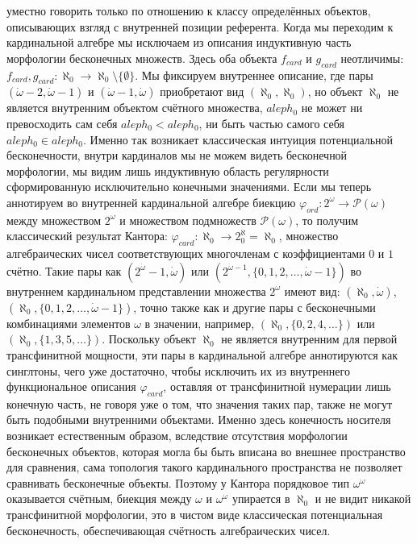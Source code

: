 \documentclass[12pt]{article}
\begin{document}
уместно говорить только по отношению к классу определённых объектов, описывающих взгляд с внутренней позиции референта. Когда мы переходим к кардинальной алгебре мы исключаем из описания индуктивную часть морфологии бесконечных множеств. Здесь оба объекта $f_{card}$ и $g_{card}$ неотличимы:  $f_{card}, g_{card} : \aleph_0 \to \aleph_0 \setminus \{ \emptyset \}$. Мы фиксируем внутреннее описание, где пары $(\dot{\omega} - 2, \dot{\omega} - 1)$ и $(\dot{\omega} - 1, \dot{\omega})$ приобретают вид $(\aleph_0, \aleph_0)$, но объект $\aleph_0$ не является внутренним объектом счётного множества, $aleph_0$ не может ни превосходить сам себя $aleph_0 < aleph_0$, ни быть частью самого себя $aleph_0 \in aleph_0$. Именно так возникает классическая интуиция потенциальной бесконечности, внутри кардиналов мы не можем видеть бесконечной морфологии, мы видим лишь индуктивную область регулярности сформированную исключительно конечными значениями. Если мы теперь аннотируем во внутренней кардинальной алгебре биекцию $\varphi_{ord} : 2^{\omega} \to \mathcal{P}(\omega)$ между множеством $2^{\omega}$ и множеством подмножеств $\mathcal{P}(\omega)$, то получим классический результат Кантора: $\varphi_{card} : \aleph_0 \to 2^\aleph_0 = \aleph_0$, множество алгебраических чисел соответствующих многочленам с коэффициентами $0$ и $1$ счётно. Такие пары как $(2^{\dot{\omega}} - 1, \dot{\omega})$ или $(2^{\dot{\omega} - 1}, \{ 0, 1, 2, \dots, \dot{\omega} - 1 \})$ во внутреннем кардинальном представлении множества $2^{\omega}$ имеют вид: $(\aleph_0, \dot{\omega})$, $(\aleph_0, \{ 0, 1, 2, \dots, \dot{\omega} - 1 \})$, точно также как и другие пары с бесконечными комбинациями элементов $\omega$ в значении, например, $(\aleph_0, \{ 0, 2, 4, \dots \})$ или $(\aleph_0, \{ 1, 3, 5, \dots \})$. Поскольку объект $\aleph_0$ не является внутренним для первой трансфинитной мощности, эти пары в кардинальной алгебре аннотируются как синглтоны, чего уже достаточно, чтобы исключить их из внутреннего функциональное описания $\varphi_{card}$, оставляя от трансфинитной нумерации лишь конечную часть, не говоря уже о том, что значения таких пар, также не могут быть подобными внутренними объектами. Именно здесь конечность носителя возникает естественным образом, вследствие отсутствия морфологии бесконечных объектов, которая могла бы быть вписана во внешнее пространство для сравнения, сама топология такого кардинального пространства не позволяет сравнивать бесконечные объекты. Поэтому у Кантора порядковое тип $\omega^{\omega}$ оказывается счётным, биекция между $\omega$ и $\omega^{\omega}$ упирается в $\aleph_0$ и не видит никакой трансфинитной морфологии, это в чистом виде классическая потенциальная бесконечность, обеспечивающая счётность алгебраических чисел. 
\end{document}
